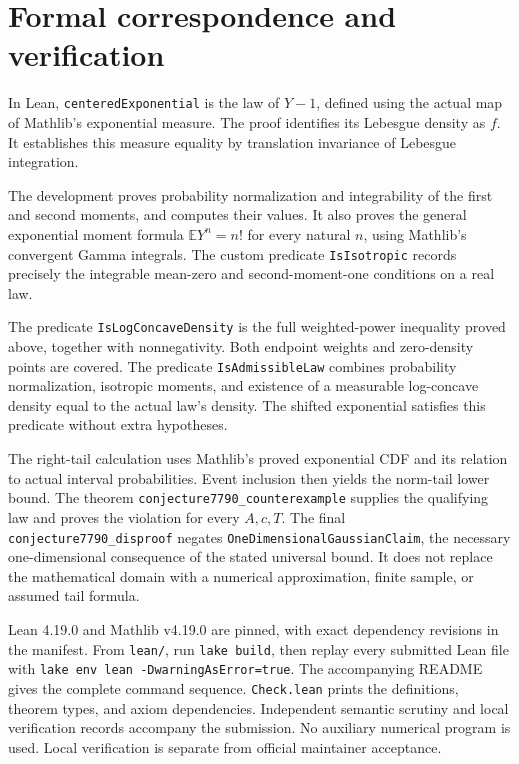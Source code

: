 \documentclass[11pt]{article}
\begin{document}
\clearpage
\section{Formal correspondence and verification}
In Lean, \texttt{centered\allowbreak{}Exponential} is the law of $Y-1$, defined using the actual map of Mathlib's exponential measure. The proof identifies its Lebesgue density as $f$. It establishes this measure equality by translation invariance of Lebesgue integration.

The development proves probability normalization and integrability of the first and second moments, and computes their values. It also proves the general exponential moment formula $\mathbb EY^n=n!$ for every natural $n$, using Mathlib's convergent Gamma integrals. The custom predicate \texttt{IsIsotropic} records precisely the integrable mean-zero and second-moment-one conditions on a real law.

The predicate \texttt{IsLogConcaveDensity} is the full weighted-power inequality proved above, together with nonnegativity. Both endpoint weights and zero-density points are covered. The predicate \texttt{IsAdmissibleLaw} combines probability normalization, isotropic moments, and existence of a measurable log-concave density equal to the actual law's density. The shifted exponential satisfies this predicate without extra hypotheses.

The right-tail calculation uses Mathlib's proved exponential CDF and its relation to actual interval probabilities. Event inclusion then yields the norm-tail lower bound. The theorem \texttt{conjecture7790\_\allowbreak{}counterexample} supplies the qualifying law and proves the violation for every $A,c,T$. The final \texttt{conjecture7790\_\allowbreak{}disproof} negates \texttt{OneDimensional\allowbreak{}Gaussian\allowbreak{}Claim}, the necessary one-dimensional consequence of the stated universal bound. It does not replace the mathematical domain with a numerical approximation, finite sample, or assumed tail formula.

Lean 4.19.0 and Mathlib v4.19.0 are pinned, with exact dependency revisions in the manifest. From \texttt{lean/}, run \texttt{lake build}, then replay every submitted Lean file with \texttt{lake env lean -DwarningAsError=true}. The accompanying README gives the complete command sequence. \texttt{Check.lean} prints the definitions, theorem types, and axiom dependencies. Independent semantic scrutiny and local verification records accompany the submission. No auxiliary numerical program is used. Local verification is separate from official maintainer acceptance.
\end{document}
